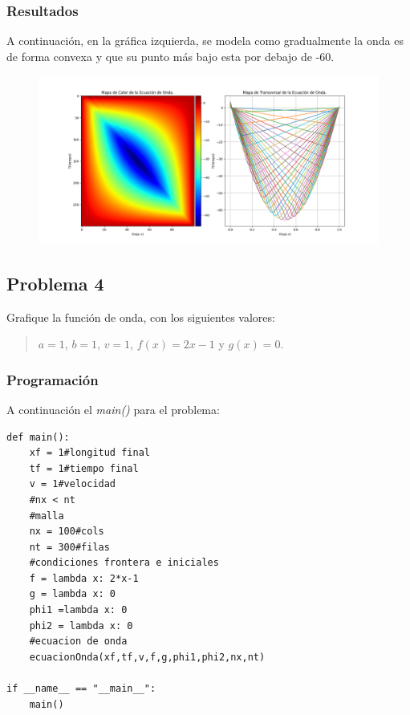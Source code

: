 \documentclass[a4paper,12pt]{article}
\newcommand{\eq}[1]{$#1$}
\begin{document}
    \subsubsection{Resultados}
    A continuación, en la gráfica izquierda, se modela como 
    gradualmente la onda es de forma convexa y que su punto más bajo 
    esta por debajo de -60.

    \begin{figure}[h]
        \centering
        \includegraphics[width=\textwidth]{graph3.png}
    \end{figure}

    \subsection{Problema 4}
    Grafique la función de onda, con los siguientes valores:
    \begin{quote}
        \centering
        \eq{a = 1}, \eq{b = 1}, \eq{v = 1}, \eq{f(x) = 2x - 1} y \eq{g(x) = 0}.
    \end{quote}
    \subsubsection{Programación}
    A continuación el \emph{main()} para el problema:

\begin{lstlisting}[frame=single]
def main():
    xf = 1#longitud final
    tf = 1#tiempo final
    v = 1#velocidad 
    #nx < nt
    #malla
    nx = 100#cols
    nt = 300#filas
    #condiciones frontera e iniciales
    f = lambda x: 2*x-1
    g = lambda x: 0
    phi1 =lambda x: 0
    phi2 = lambda x: 0
    #ecuacion de onda
    ecuacionOnda(xf,tf,v,f,g,phi1,phi2,nx,nt)

if __name__ == "__main__":
    main()
\end{lstlisting}
\end{document}
